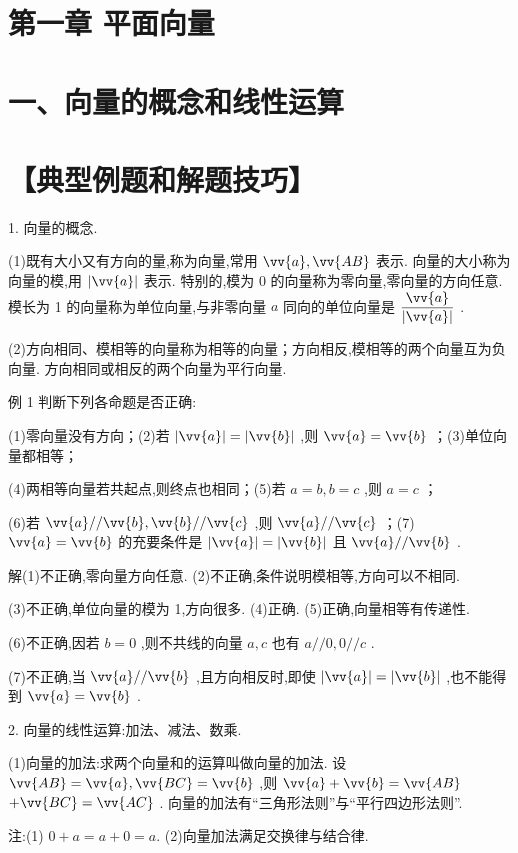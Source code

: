 \section*{第一章 平面向量}

\section*{一、向量的概念和线性运算}

\section*{【典型例题和解题技巧】}

1. 向量的概念.

(1)既有大小又有方向的量,称为向量,常用 $\vv{a},\vv{AB}$ 表示. 向量的大小称为向量的模,用 $\left| \vv{a}\right|$ 表示. 特别的,模为 0 的向量称为零向量,零向量的方向任意. 模长为 1 的向量称为单位向量,与非零向量 $a$ 同向的单位向量是 $\dfrac{\vv{a}}{\left| \vv{a}\right| }$ .

(2)方向相同、模相等的向量称为相等的向量；方向相反,模相等的两个向量互为负向量. 方向相同或相反的两个向量为平行向量.

例 1 判断下列各命题是否正确:

(1)零向量没有方向；(2)若 $\left| \vv{a}\right|  = \left| \vv{b}\right|$ ,则 $\vv{a} = \vv{b}$ ；(3)单位向量都相等；

(4)两相等向量若共起点,则终点也相同；(5)若 $a = b,b = c$ ,则 $a = c$ ；

(6)若 $\vv{a}//\vv{b},\vv{b}//\vv{c}$ ,则 $\vv{a}//\vv{c}$ ；(7) $\vv{a} = \vv{b}$ 的充要条件是 $\left| \vv{a}\right|  = \left| \vv{b}\right|$ 且 $\vv{a}//\vv{b}$ .

解(1)不正确,零向量方向任意. (2)不正确,条件说明模相等,方向可以不相同.

(3)不正确,单位向量的模为 1,方向很多. (4)正确. (5)正确,向量相等有传递性.

(6)不正确,因若 $b = 0$ ,则不共线的向量 $a,c$ 也有 $a//0,0//c$ .

(7)不正确,当 $\vv{a}//\vv{b}$ ,且方向相反时,即使 $\left| \vv{a}\right|  = \left| \vv{b}\right|$ ,也不能得到 $\vv{a} = \vv{b}$ .

2. 向量的线性运算:加法、减法、数乘.

(1)向量的加法:求两个向量和的运算叫做向量的加法. 设 $\vv{AB} = \vv{a},\vv{BC} = \vv{b}$ ,则 $\vv{a} + \vv{b} = \vv{AB}$  $+ \vv{BC} = \vv{AC}$ . 向量的加法有“三角形法则”与“平行四边形法则”.

注:(1) $0 + a = a + 0 = a.$ (2)向量加法满足交换律与结合律.

